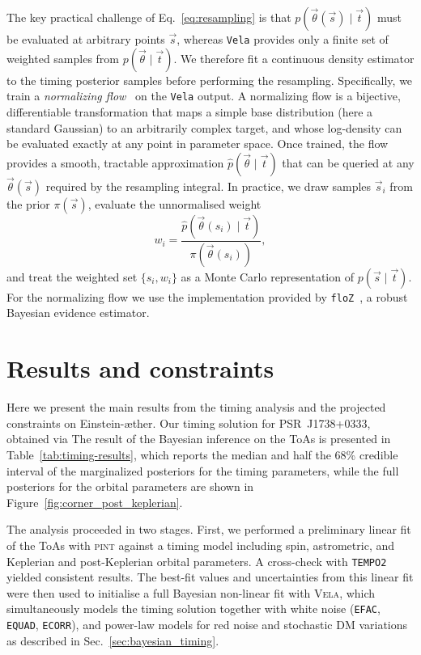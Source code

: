 \documentclass[
    floats,
    floatfix,
    amssymb,
    prd,
    twocolumn,
    superscriptaddress,
    nofootinbib,
    unicode,
    colorlinks=true,
    linktocpage=true
]{revtex4-2}
\begin{document}
The key practical challenge of Eq.~\eqref{eq:resampling} is that
$p(\vec{\theta}(\vec{s})\mid\vec{t})$
must be evaluated at arbitrary points $\vec{s}$, whereas \texttt{Vela} provides only a finite set of weighted samples from $p(\vec{\theta}\mid\vec{t})$. We therefore fit a
continuous density estimator to the timing posterior samples before
performing the resampling. Specifically, we train a \emph{normalizing
flow}~\cite{Kobyzev:2019ydm} on the \texttt{Vela} output. A normalizing flow
is a bijective, differentiable transformation that maps a simple base
distribution (here a standard Gaussian) to an arbitrarily complex target,
and whose log-density can be evaluated exactly at any point in parameter
space. Once trained, the flow provides a smooth, tractable approximation
$\hat{p}(\vec{\theta}\mid\vec{t})$ that can be queried at any
$\vec{\theta}(\vec{s})$ required by the resampling integral. In practice, we draw samples $\vec{s}_i$ from the prior $\pi(\vec{s})$,
evaluate the unnormalised weight
\begin{equation}
    w_i =
    \frac{\hat{p}\!\left(\vec{\theta}(s_i)\mid\vec{t}\right)}
         {\pi\!\left(\vec{\theta}(s_i)\right)},
\label{eq:weights}
\end{equation}
and treat the weighted set $\{s_i, w_i\}$ as a Monte Carlo
representation of $p(\vec{s}\mid\vec{t})$.
For the normalizing flow we use the implementation provided by
\texttt{floZ}~\cite{Srinivasan:2024uax}, a robust
Bayesian evidence
estimator.


\section{Results and constraints}
\label{sec:results}

Here we present the main results from the timing analysis and the projected
constraints on Einstein-\ae ther. Our timing solution for PSR~J1738+0333, 
obtained via 
The result of the Bayesian inference on the ToAs is presented in 
Table~\ref{tab:timing-results}, which reports the median and half the 68\% credible 
interval of the marginalized posteriors for the timing parameters, while the full 
posteriors for the orbital parameters are shown in Figure~\ref{fig:corner_post_keplerian}.

The analysis proceeded in two stages. First, we performed a preliminary 
linear fit of the ToAs with \textsc{pint} against a timing model including 
spin, astrometric, and Keplerian and post-Keplerian orbital parameters. 
A cross-check with {\tt TEMPO2}~\citep{Hobbs:2006zg} yielded consistent results. 
The best-fit values and uncertainties from this linear fit were then used 
to initialise a full Bayesian non-linear fit with \textsc{Vela}, which 
simultaneously models the timing solution together with white noise 
(\texttt{EFAC}, \texttt{EQUAD}, \texttt{ECORR}), and power-law models 
for red noise and stochastic DM variations as described in Sec.~\ref{sec:bayesian_timing}. 
\end{document}
